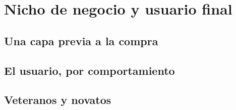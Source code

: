 \section{Nicho de negocio y usuario final}\label{sec:nicho}

\subsection{Una capa previa a la compra}

\subsection{El usuario, por comportamiento}

\subsection{Veteranos y novatos}
